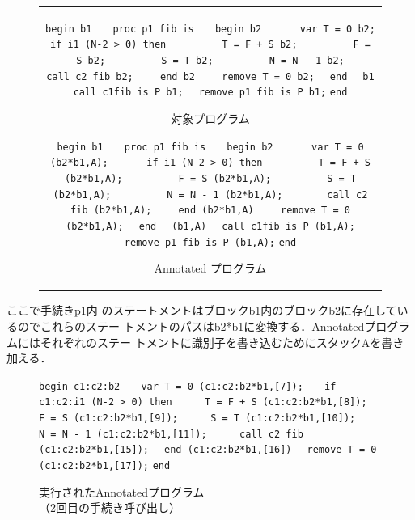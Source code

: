\documentclass[submit,PRO]{ipsj}
\def\|{\verb|}
\begin{document}
\begin{figure}[tb]
\begin{center}
\begin{tabular}{c}
\begin{minipage}[t]{0.5\columnwidth}
\footnotesize
\setbox0\vbox{
\hbox{\|begin b1|}
\hbox{\|   proc p1 fib is|}
\hbox{\|   begin b2|}
\hbox{\|      var T = 0 b2;|}
\hbox{\|      if i1 (N-2 > 0) then|}
\hbox{\|         T = F + S b2;|}
\hbox{\|         F = S b2;|}
\hbox{\|         S = T b2;|}
\hbox{\|         N = N - 1 b2;|}
\hbox{\|       call c2 fib b2;|}
\hbox{\|    end b2|}
\hbox{\|    remove T = 0 b2;|}
\hbox{\|  end|}
\hbox{\|  b1|}
\hbox{\|  call c1fib is P b1;|}
\hbox{\|  remove p1 fib is P b1;|}
\hbox{\|end|}
}
\centerline{\fbox{\box0}}
\caption{対象プログラム}
\ecaption{Original Program}
\label{fig:Horiginal}
\end{minipage}

\begin{minipage}[t]{0.5\columnwidth}
\footnotesize
\setbox0\vbox{
\hbox{\|begin b1|}
\hbox{\|   proc p1 fib is|}
\hbox{\|   begin b2|}
\hbox{\|      var T = 0 (b2*b1,A);|}
\hbox{\|      if i1 (N-2 > 0) then|}
\hbox{\|         T = F + S (b2*b1,A);|}
\hbox{\|         F = S (b2*b1,A);|}
\hbox{\|         S = T (b2*b1,A);|}
\hbox{\|         N = N - 1 (b2*b1,A);|}
\hbox{\|       call c2 fib (b2*b1,A);|}
\hbox{\|    end (b2*b1,A)|}
\hbox{\|    remove T = 0 (b2*b1,A);|}
\hbox{\|  end|}
\hbox{\|  (b1,A)|}
\hbox{\|  call c1fib is P (b1,A);|}
\hbox{\|  remove p1 fib is P (b1,A);|}
\hbox{\|end|}
}
\centerline{\fbox{\box0}}
\caption{Annotated プログラム}
\ecaption{Annotated Program}
\label{fig:Hannotated}
\end{minipage}
\end{tabular}
\end{center}
\end{figure}

ここで手続きp1内
のステートメントはブロックb1内のブロックb2に存在しているのでこれらのステー
トメントのパスはb2*b1に変換する．Annotatedプログラムにはそれぞれのステー
トメントに識別子を書き込むためにスタックAを書き加える．

\begin{figure}[tb]
\vbox{
\hbox{\|begin c1:c2:b2|}
\hbox{\|   var T = 0 (c1:c2:b2*b1,[7]);|}
\hbox{\|   if c1:c2:i1 (N-2 > 0) then|}
\hbox{\|     T = F + S (c1:c2:b2*b1,[8]);|}
\hbox{\|     F = S (c1:c2:b2*b1,[9]);|}
\hbox{\|     S = T (c1:c2:b2*b1,[10]);|}
\hbox{\|     N = N - 1 (c1:c2:b2*b1,[11]);|}
\hbox{\|     call c2 fib (c1:c2:b2*b1,[15]);|}
\hbox{\|  end (c1:c2:b2*b1,[16])|}
\hbox{\|  remove T = 0 (c1:c2:b2*b1,[17]);|}
\hbox{\|end|}
}
\centerline{}
\caption{実行されたAnnotatedプログラム\\
（2回目の手続き呼び出し）}
\label{fig:Hexec}
\end{figure}
\end{document}
